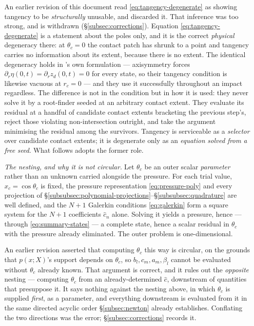 An earlier revision of this document read \eqref{eq:tangency-degenerate} as showing tangency to be \emph{structurally} unusable, and discarded it. That inference was too strong, and is withdrawn (\S\ref{subsec:corrections}). Equation \eqref{eq:tangency-degenerate} is a statement about the poles only, and it is the correct \emph{physical} degeneracy there: at $\theta_c=0$ the contact patch has shrunk to a point and tangency carries no information about its extent, because there is no extent. The identical degeneracy holds in \cite{AgueroEtAl2026}'s own formulation --- axisymmetry forces $\partial_r\eta(0,t)=\partial_rz_d(0,t)=0$ for every state, so their tangency condition \citep{AgueroEtAl2026} is likewise vacuous at $r_c=0$ --- and they use it successfully throughout an impact regardless. The difference is not in the condition but in how it is used: they never solve it by a root-finder seeded at an arbitrary contact extent. They evaluate its residual at a handful of candidate contact extents bracketing the previous step's, reject those violating non-intersection outright, and take the argument minimising the residual among the survivors. Tangency is serviceable as a \emph{selector} over candidate contact extents; it is degenerate only as an \emph{equation solved from a free seed}. What follows adopts the former role.

\emph{The nesting, and why it is not circular.} Let $\theta_c$ be an outer scalar \emph{parameter} rather than an unknown carried alongside the pressure. For each trial value, $x_c=\cos\theta_c$ is fixed, the pressure representation \eqref{eq:pressure-poly} and every projection of \S\ref{subsubsec:polynomial-projections}--\S\ref{subsubsec:quadrature} are well defined, and the $N+1$ Galerkin conditions \eqref{eq:galerkin} form a square system for the $N+1$ coefficients $\hat c_n$ alone. Solving it yields a pressure, hence --- through \eqref{eq:summary-states} --- a complete state, hence a scalar residual in $\theta_c$ with the pressure already eliminated. The outer problem is one-dimensional.

An earlier revision asserted that computing $\theta_c$ this way is circular, on the grounds that $p(x;X)$'s support depends on $\theta_c$, so $b_l,c_m,a_m,\beta_l$ cannot be evaluated without $\theta_c$ already known. That argument is correct, and it rules out the \emph{opposite} nesting --- computing $\theta_c$ from an already-determined $\hat c$, downstream of quantities that presuppose it. It says nothing against the nesting above, in which $\theta_c$ is supplied \emph{first}, as a parameter, and everything downstream is evaluated from it in the same directed acyclic order \S\ref{subsec:newton} already establishes. Conflating the two directions was the error; \S\ref{subsec:corrections} records it.

